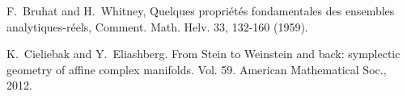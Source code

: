 \documentclass[a4paper,11pt]{article}
\theoremstyle{definition}
\newcommand{\RR}{\mathbb{R}}
\newcommand{\mat}[4]{\begin{pmatrix} #1 & #2 \\ #3 & #4 \end{pmatrix}}
\begin{document}


\begin{thebibliography}{99}
   F.\ Bruhat and H.\ Whitney, Quelques propri\'et\'es fondamentales des ensembles analytiques-r\'eels, Comment. Math. Helv. 33, 132-160 (1959).

   K.\ Cieliebak and Y.\ Eliashberg. From Stein to Weinstein and back: symplectic geometry of affine complex manifolds. Vol. 59. American Mathematical Soc., 2012.
\end{thebibliography}
\end{document}
